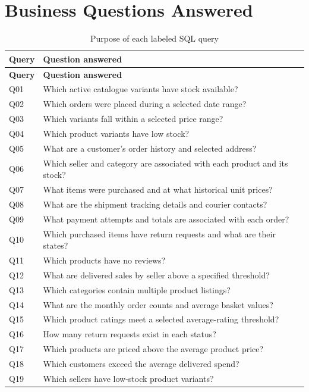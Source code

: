 \documentclass[11pt,a4paper,oneside]{report}
\begin{document}
\section{Business Questions Answered}
\small
\begin{longtable}{P{0.11\textwidth}P{0.75\textwidth}}
\caption{Purpose of each labeled SQL query}\label{tab:querylist}\\
\toprule
\textbf{Query} & \textbf{Question answered}\\\midrule
\endfirsthead
\toprule
\textbf{Query} & \textbf{Question answered}\\\midrule
\endhead
\bottomrule
\endfoot
Q01 & Which active catalogue variants have stock available?\\
Q02 & Which orders were placed during a selected date range?\\
Q03 & Which variants fall within a selected price range?\\
Q04 & Which product variants have low stock?\\
Q05 & What are a customer's order history and selected address?\\
Q06 & Which seller and category are associated with each product and its stock?\\
Q07 & What items were purchased and at what historical unit prices?\\
Q08 & What are the shipment tracking details and courier contacts?\\
Q09 & What payment attempts and totals are associated with each order?\\
Q10 & Which purchased items have return requests and what are their states?\\
Q11 & Which products have no reviews?\\
Q12 & What are delivered sales by seller above a specified threshold?\\
Q13 & Which categories contain multiple product listings?\\
Q14 & What are the monthly order counts and average basket values?\\
Q15 & Which product ratings meet a selected average-rating threshold?\\
Q16 & How many return requests exist in each status?\\
Q17 & Which products are priced above the average product price?\\
Q18 & Which customers exceed the average delivered spend?\\
Q19 & Which sellers have low-stock product variants?\\

\end{longtable}
\end{document}
